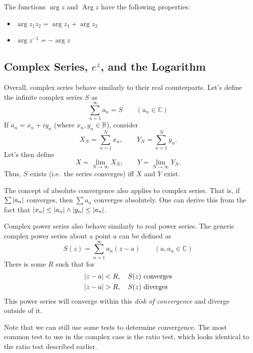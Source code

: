 \documentclass[10pt]{scrartcl}
\numberwithin{equation}{subsection}
\theoremstyle{definition}
\theoremstyle{remark}
\newcommand{\Reals}{\mathbb{R}}
\newcommand{\Complex}{\mathbb{C}}
\newcommand{\inv}[1]{
		{#1}^{-1}
	}
\DeclareMathOperator{\Arg}{Arg}
\begin{document}
The functions $\arg{z}$ and $\Arg{z}$ have the following properties:
\begin{itemize}
	\item $\arg{z_1 z_2} = \arg{z_1} + \arg{z_2}$
	\item $\arg{\inv{z}} = - \arg{z}$
\end{itemize}
\subsection{Complex Series, $e^z$, and the Logarithm}
Overall, complex series behave similarly to their real counterparts.
Let's define the infinite complex series $S$ as 
\begin{equation}
	\sum_{n=1}^{\infty} a_n = S \qquad (a_n \in \Complex)
\end{equation}
If $a_n = x_n + i y_n$ (where $x_n, y_n \in \Reals$), consider
\[
	X_N = \sum_{n=1}^{N} x_n, \qquad Y_N = \sum_{n=1}^{N} y_n.
\]
Let's then define
\[
	X = \lim_{N \to \infty} X_N, \qquad Y = \lim_{N \to \infty} Y_N.
\]
Thus, $S$ exists (i.e.\ the series converges) iff $X$ and $Y$ exist.

The concept of absolute convergence also applies to complex series.
That is, if $\sum \abs{a_n}$ converges, then $ \sum a_n$ converges absolutely. 
One can derive this from the fact that $\abs{x_n} \leq \abs{a_n} \wedge
\abs{y_n} \leq \abs{a_n}$.

Complex power series also behave similarly to real power series. The generic
complex power series about a point $a$ can be defined as
\begin{equation}
	S(z) = \sum_{n=1}^{\infty} a_n (z - a) \qquad (a, a_n \in \Complex)
\end{equation}
There is some $R$ such that for
\begin{align*}
	\abs{z-a} &< R, \quad S(z)~\text{converges} \\
	\abs{z-a} &> R, \quad S(z)~\text{diverges} \\
\end{align*}
This power series will converge within this \textit{disk of convergence} and
diverge outside of it.

Note that we can still use some tests to determine convergence. The most common
test to use in the complex case is the ratio test, which looks identical to the
ratio test described earlier.
\end{document}
